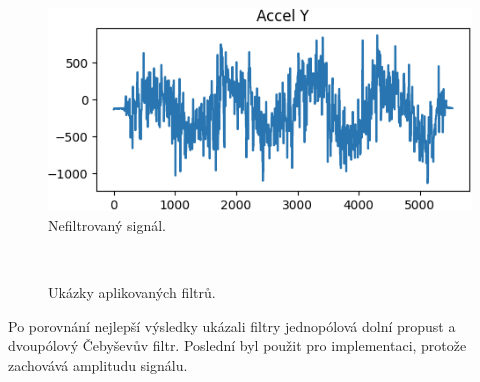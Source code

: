 \begin{figure}[!h]
	\centering
	\vspace{-5pt}
    \includegraphics[width = 0.7\linewidth]{Figures/NoFilter.png}
    \caption{Nefiltrovaný signál.}
    \label{fig:NoFilter}
    \vspace{-10pt}
\end{figure}

\begin{figure}[!h]
    \centering
     \\
    \caption{Ukázky aplikovaných filtrů.}
    \label{fig:filters}
\end{figure}

Po porovnání nejlepší výsledky ukázali filtry jednopólová dolní propust a
dvoupólový Čebyševův filtr. Poslední byl použit pro implementaci,
protože zachovává amplitudu signálu.
\endinput
